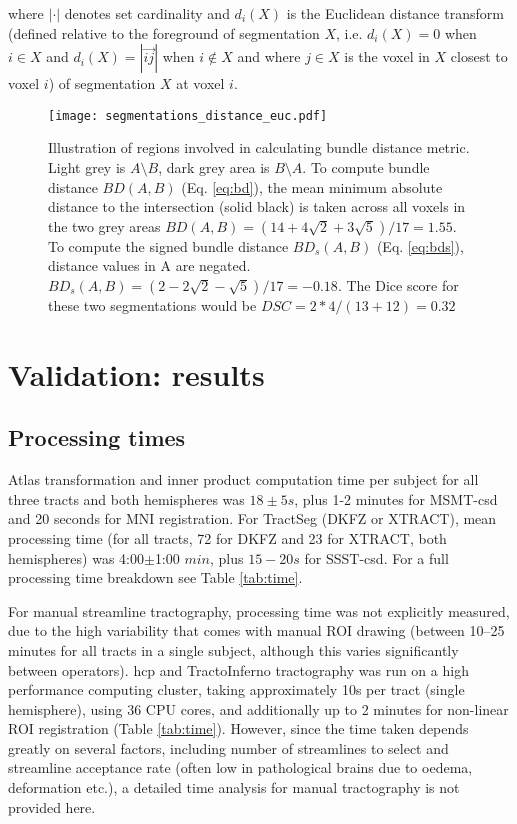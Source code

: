 where $| \cdot |$ denotes set cardinality and $d_i(X)$ is the Euclidean distance transform (defined relative to the foreground of segmentation $X$, i.e. $d_i(X) = 0$ when $i \in X $ and $d_i(X) = |\overrightarrow{ij}|$ when $i \not\in X$ and where $j \in X$ is the voxel in $X$ closest to voxel $i$)  of segmentation $X$ at voxel $i$.

\begin{figure}[htbp!]
  \centering
  \texttt{[image: segmentations\_distance\_euc.pdf]}
  \caption{Illustration of regions involved in calculating bundle distance metric. Light grey is $A\setminus B$, dark grey area is $B\setminus A$. To compute bundle distance $BD(A,B)$ (Eq. \ref{eq:bd}), the mean minimum absolute distance to the intersection (solid black) is taken across all voxels in the two grey areas $BD(A,B) = (14+4\sqrt{2}+3\sqrt{5})/17 = 1.55$. To compute the signed bundle distance $BD_s(A,B)$ (Eq. \ref{eq:bds}), distance values in A are negated. $BD_s(A,B) = (2-2\sqrt{2}-\sqrt{5})/17 = -0.18$. The Dice score for these two segmentations would be $DSC = 2*4/(13+12) = 0.32$}
  \label{fig:BD}
\end{figure}

\section{Validation: results}
\label{sec:validation}

\subsection{Processing times}

Atlas transformation and inner product computation time per subject for all three tracts and both hemispheres was $18\pm5 s$, plus 1-2 minutes for MSMT-\gls{csd} and 20 seconds for MNI registration.
For TractSeg (DKFZ or XTRACT), mean processing time (for all tracts, 72 for DKFZ and 23 for XTRACT, both hemispheres) was 4:00$\pm$1:00 $min$, plus $15-20 s$ for SSST-\gls{csd}.
For a full processing time breakdown see Table \ref{tab:time}.

For manual streamline tractography, processing time was not explicitly measured, due to the high variability that comes with manual ROI drawing (between 10--25 minutes for all tracts in a single subject, although this varies significantly between operators).
\Gls{hcp} and TractoInferno tractography was run on a high performance computing cluster, taking approximately 10s per tract (single hemisphere), using 36 CPU cores, and additionally up to 2 minutes for non-linear ROI registration (Table \ref{tab:time}).
However, since the time taken depends greatly on several factors, including number of streamlines to select and streamline acceptance rate (often low in pathological brains due to oedema, deformation etc.), a detailed time analysis for manual tractography is not provided here.

